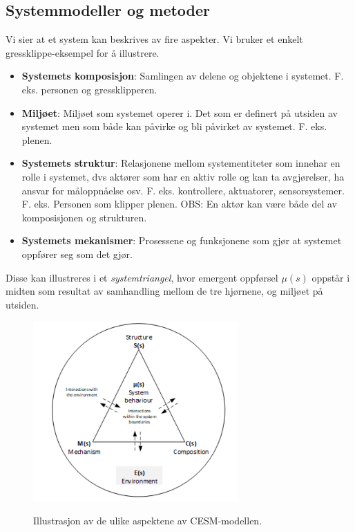 \subsection{Systemmodeller og metoder}

Vi sier at et system kan beskrives av fire aspekter. Vi bruker et enkelt gressklippe-eksempel for å illustrere.

\begin{itemize}
    \item \textbf{Systemets komposisjon}: Samlingen av delene og objektene i systemet. F. eks. personen og gressklipperen.
    \item \textbf{Miljøet}: Miljøet som systemet operer i. Det som er definert på utsiden av systemet men som både kan påvirke og bli påvirket av systemet. F. eks. plenen.
    \item \textbf{Systemets struktur}: Relasjonene mellom systementiteter som innehar en rolle i systemet, dvs aktører som har en aktiv rolle og kan ta avgjørelser, ha ansvar for måloppnåelse osv. F. eks. kontrollere, aktuatorer, sensorsystemer. F. eks. Personen som klipper plenen. OBS: En aktør kan være både del av komposisjonen og strukturen.
    \item \textbf{Systemets mekanismer}: Prosessene og funksjonene som gjør at systemet oppfører seg som det gjør. 
\end{itemize}

Disse kan illustreres i et \textit{systemtriangel}, hvor emergent oppførsel $\mu(s)$ oppstår i midten som resultat av samhandling mellom de tre hjørnene, og miljøet på utsiden.

\begin{figure}[H]
    \centering
        \includegraphics[width=0.7\textwidth]{figures/IEC/cesm.PNG}\\
        \caption{Illustrasjon av de ulike aspektene av CESM-modellen.}
\end{figure}

